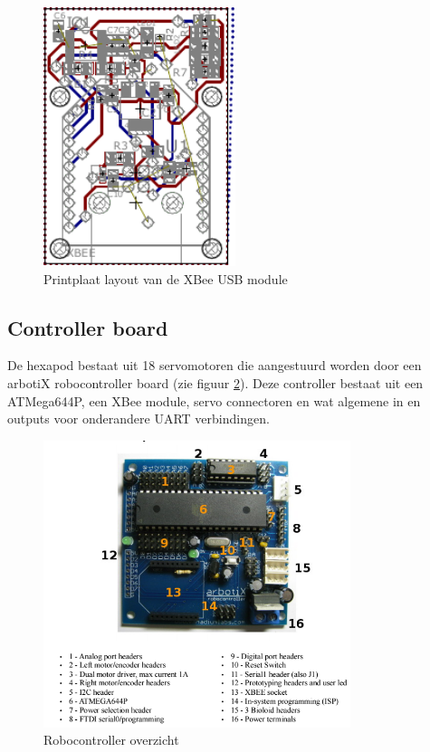 \documentclass[10pt,a4paper]{article}
\begin{document}
\begin{figure}[h]
    \centering
    \includegraphics[width=0.5\textwidth]{board-xbee}
    \caption{Printplaat layout van de XBee USB module}
    \label{fig:board-xbee}
\end{figure}

\subsection{Controller board}
De hexapod bestaat uit 18 servomotoren die aangestuurd worden door een arbotiX robocontroller board (zie figuur \ref{fig:robocontroller-overview}). Deze controller bestaat uit een ATMega644P, een XBee module, servo connectoren en wat algemene in en outputs voor onderandere UART verbindingen.
\begin{figure}[h]
    \centering
    \includegraphics[width=0.8\textwidth]{robocontroller-overview.png}
    \caption{Robocontroller overzicht}
    \label{fig:robocontroller-overview}
\end{figure}
\end{document}
